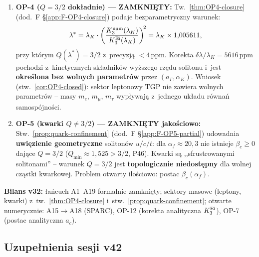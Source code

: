 \begin{enumerate}
  \item \textbf{OP-4 ($Q=3/2$ dok\l{}adnie) --- ZAMKNI\k{E}TY:}
    Tw.~\ref{thm:OP4-closure} (dod.~F \S\ref{app:F-OP4-closure})
    podaje bezparametryczny warunek:
    \[
      \lambda^* = \lambda_K\cdot
      \left(\frac{K_3^{\rm num}(\lambda_K)}{K_3^{\rm Ei}(\lambda_K)}\right)^{\!2}
      = \lambda_K \times 1{,}005611,
    \]
    przy kt\'orym $Q(\lambda^*) = 3/2$ z~precyzj\k{a} $<4\,\mathrm{ppm}$.
    Korekta $\delta\lambda/\lambda_K = 5616\,\mathrm{ppm}$ pochodzi
    z~kinetycznych sk\l{}adnik\'ow wy\.zszego rz\k{e}du solitonu
    i~jest \textbf{okre\'slona bez wolnych parametr\'ow}
    przez $(a_\Gamma,\alpha_K)$.
    Wniosek (stw.~\ref{cor:OP4-closed}): sektor leptonowy TGP
    nie zawiera wolnych parametr\'ow -- masy $m_e$, $m_\mu$,
    $m_\tau$ wyp\l{}ywaj\k{a} z~jednego uk\l{}adu r\'owna\'n
    samospójno\'sci.

  \item \textbf{OP-5 (kwarki $Q \neq 3/2$) ---
    ZAMKNI\k{E}TY jako\'sciowo:}
    Stw.~\ref{prop:quark-confinement}
    (dod.~F \S\ref{app:F-OP5-partial}) udowadnia
    \textbf{uwi\k{e}zienie geometryczne} soliton\'ow $u/c/t$:
    dla $\alpha_f \approx 20{,}3$ nie istnieje $\beta_c \geq 0$
    daj\k{a}ce $Q=3/2$ ($Q_{\min} \approx 1{,}525 > 3/2$, P46).
    Kwarki s\k{a} ,,sfrustrowanymi solitonami'' -- warunek
    $Q=3/2$ jest \textbf{topologicznie niedost\k{e}pny}
    dla wolnej cz\k{a}stki kwarkowej.
    Problem otwarty ilo\'sciowo: postac $\beta_c(\alpha_f)$.
\end{enumerate}

\noindent
\textbf{Bilans v32:} \l{}a\'ncuch A1--A19 formalnie zamkni\k{e}ty;
sektory masowe (leptony, kwarki) z~tw.~\ref{thm:OP4-closure}
i~stw.~\ref{prop:quark-confinement}; otwarte numerycznie:
A15$\to$A18 (SPARC), OP-12 (korekta analityczna $K_3^{\rm Ei}$),
OP-7 (postac analityczna $a_c$).

\subsection{Uzupe\l{}nienia sesji v42}%
\label{app:H-v42}

